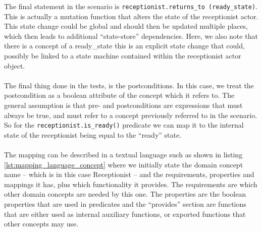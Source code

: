 The final statement in the scenario is \texttt{receptionist.returns\_to (ready\_state)}. This is actually a mutation function that alters the state of the receptionist actor. This state change could be global and should then  be updated multiple places, which then leads to additional ``state-store'' dependencies. Here, we also note that there is a concept of a ready\_state this is an explicit state change that could, possibly be linked to a state machine contained within the receptionist actor object.\\\\
The final thing done in the tests, is the postconditions. In this case, we treat the postcondition as a boolean attribute of the concept which it refers to. The general assumption is that pre- and postconditions are expressions that must always be true, and must refer to a concept previously referred to in the scenario. So for the \texttt{receptionist.is\_ready()} predicate we can map it to the internal state of the receptionist being equal to the ``ready'' state.\\\\
The mapping can be described in a textual language such as shown in listing \ref{lst:mapping_language_concept} where we initially state the domain concept name -- which is in this case Receptionist -- and the requirements, properties and mappings it has, plus which functionality it provides. The requirements are which other domain concepts are needed by this one. The properties are the boolean properties that are used in predicates and the ``provides'' section are functions that are either used as internal auxiliary functions, or exported functions that other concepts may use.

